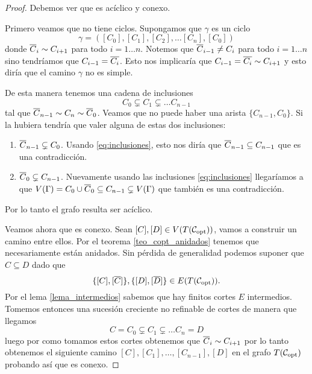 \documentclass[tesis.tex]{subfiles}
\begin{document}
\begin{proof}
	Debemos ver que es acíclico y conexo.
	
	Primero veamos que no tiene ciclos.
	Supongamos que $\gamma$	es un ciclo
	\[
		\gamma = ([C_0], [C_1], [C_2], \dots [C_{n}], [C_0])
	\]
	donde $\overline C_{i} \sim C_{i+1}$ para todo $i=1 \dots n$.
	Notemos que $\overline C_{i-1} \neq C_{i}$ para todo $i=1 \dots n$ sino tendríamos que $C_{i-1} = \overline{ C_{i}}$. 
	Esto nos implicaría que $C_{i-1} = \overline{C_{i}} \sim C_{i+1}$
	y esto diría que el camino $\gamma$ no es simple.
	
	De esta manera tenemos una cadena de inclusiones
	\begin{equation}\label{eq:inclusiones}
			C_0 \subsetneq C_1 \subsetneq \dots C_{n-1}
	\end{equation}
	tal que $\overline C_{n-1} \sim C_n \sim \overline C_0$.
	Veamos que no puede haber una arista $\{C_{n-1}, C_0\}$.
	Si la hubiera tendría que valer alguna de estas dos inclusiones:
	\begin{enumerate}
		\item $\overline C_{n-1} \subsetneq C_0$.
		Usando \ref{eq:inclusiones}, esto nos diría que $\overline C_{n-1} \subseteq C_{n-1}$ que es una contradicción.
		\item $\overline C_{0} \subsetneq C_{n-1}$.
		Nuevamente usando las inclusiones \ref{eq:inclusiones} llegaríamos a que $V(\Gamma) = C_0 \cup \overline C_0 \subseteq C_{n-1} \subsetneq V(\Gamma)$ que también es una contradicción.
	\end{enumerate}
	Por lo tanto el grafo resulta ser acíclico.
	
	Veamos ahora que es conexo.
	Sean $[C], [D] \in V(T({\cal C}_{\text{opt}}))$, vamos a construir un camino entre ellos.
	Por el teorema \ref{teo_copt_anidados} tenemos que necesariamente están anidados.
	Sin pérdida de generalidad podemos suponer que $C \subseteq D$ dado que
	\[
	\{[C], [\overline C]\}, \{[D],[\overline D]\} \in E(T({\cal C}_{\text{opt}})).
	\]
	Por el lema \ref{lema_intermedios} sabemos que hay finitos cortes $E$ intermedios.
	Tomemos entonces una sucesión creciente no refinable de cortes de manera que llegamos 
	\[
		C=C_0 \subsetneq C_1 \subsetneq \dots C_n = D
	\]
	luego por como tomamos estos cortes obtenemos que $\overline C_i \sim C_{i+1}$ por lo tanto obtenemos el siguiente camino $[C],[C_1], \dots, [C_{n-1}],[D]$ en el grafo $T({\cal C}_{\text{opt}})$ probando así que es conexo.	
\end{proof}
\begin{center}
	\missingfigure[figwidth=6cm]{}
\end{center}
\end{document}
